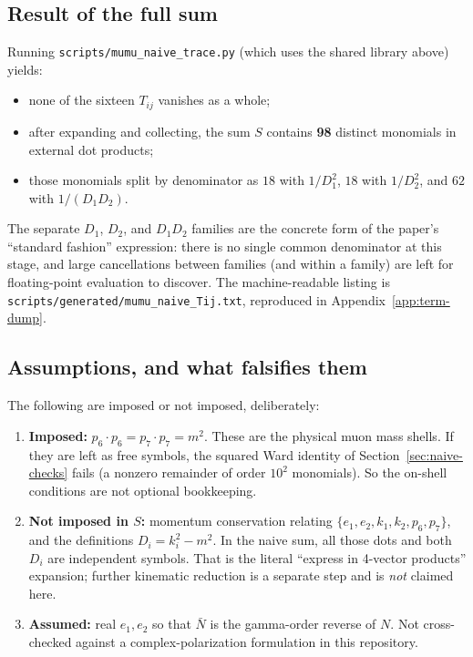 \documentclass[11pt]{article}
\begin{document}
\subsection{Result of the full sum}
\label{sec:naive-result}

Running \texttt{scripts/mumu\_naive\_trace.py} (which uses the shared
library above) yields:
\begin{itemize}
  \item none of the sixteen $T_{ij}$ vanishes as a whole;
  \item after expanding and collecting, the sum $S$ contains
    \textbf{98} distinct monomials in external dot products;
  \item those monomials split by denominator as
    $18$ with $1/D_1^2$, $18$ with $1/D_2^2$, and $62$ with $1/(D_1 D_2)$.
\end{itemize}
The separate $D_1$, $D_2$, and $D_1 D_2$ families are the concrete form of
the paper's ``standard fashion'' expression: there is no single common
denominator at this stage, and large cancellations between families (and
within a family) are left for floating-point evaluation to discover. The
machine-readable listing is
\texttt{scripts/generated/mumu\_naive\_Tij.txt}, reproduced in
Appendix~\ref{app:term-dump}.

\subsection{Assumptions, and what falsifies them}
\label{sec:naive-assumptions}

The following are imposed or not imposed, deliberately:

\begin{enumerate}
  \item \textbf{Imposed:} $p_6{\cdot}p_6=p_7{\cdot}p_7=m^2$.
    These are the physical muon mass shells. If they are left as free
    symbols, the squared Ward identity of
    Section~\ref{sec:naive-checks} fails (a nonzero remainder of order
    $10^2$ monomials). So the on-shell conditions are not optional bookkeeping.
  \item \textbf{Not imposed in $S$:} momentum conservation relating
    $\{e_1,e_2,k_1,k_2,p_6,p_7\}$, and the definitions
    $D_i=k_i^2-m^2$. In the naive sum, all those dots and both $D_i$ are
    independent symbols. That is the literal ``express in 4-vector
    products'' expansion; further kinematic reduction is a separate step
    and is \emph{not} claimed here.
  \item \textbf{Assumed:} real $e_1,e_2$ so that $\bar N$ is the gamma-order
    reverse of $N$. Not cross-checked against a complex-polarization
    formulation in this repository.
\end{enumerate}
\end{document}
